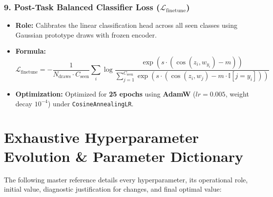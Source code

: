 \documentclass[11pt,a4paper]{article}
\begin{document}
    \subsubsection{9. Post-Task Balanced Classifier Loss ($\mathcal{L}_{\text{finetune}}$)}
    \begin{itemize}[leftmargin=*]
        \item \textbf{Role:} Calibrates the linear classification head across all seen classes using Gaussian prototype draws with frozen encoder.
        \item \textbf{Formula:}
        \begin{equation}
            \mathcal{L}_{\text{finetune}} = - \frac{1}{N_{\text{draws}} \cdot C_{\text{seen}}} \sum_{i} \log \frac{\exp(s \cdot (\cos(z_i, w_{y_i}) - m))}{\sum_{j=1}^{C_{\text{seen}}} \exp(s \cdot (\cos(z_i, w_j) - m \cdot \mathbb{I}[j = y_i]))}
        \end{equation}
        \item \textbf{Optimization:} Optimized for \textbf{25 epochs} using \textbf{AdamW} ($lr=0.005$, weight decay $10^{-4}$) under \texttt{CosineAnnealingLR}.
    \end{itemize}

    \newpage

    \section{Exhaustive Hyperparameter Evolution \& Parameter Dictionary}
    \label{sec:hyperparameters}

    The following master reference details every hyperparameter, its operational role, initial value, diagnostic justification for changes, and final optimal value:
\end{document}
